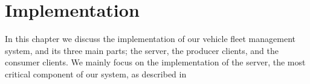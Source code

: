 \chapter{Implementation}\label{cha:implementation}
In this chapter we discuss the implementation of our vehicle fleet management system, and its three main parts; the server, the producer clients, and the consumer clients.
We mainly focus on the implementation of the server, the most critical component of our system, as described in 
